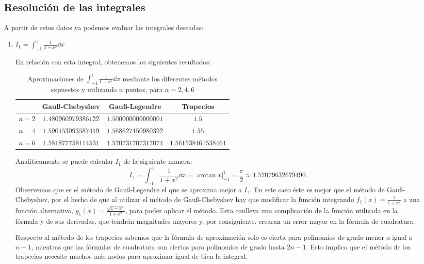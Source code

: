 \documentclass[a4paper]{article}
\begin{document}
\subsection*{Resolución de las integrales}
A partir de estos datos ya podemos evaluar las integrales deseadas:
\begin{enumerate}
    \item $\displaystyle I_1=\int_{-1}^1\frac{1}{1+x^2}\dd x$\par
    En relación con esta integral, obtenemos los siguientes resultados:
    \begin{table}[ht]
        \centering
        \captionsetup{width=0.9\textwidth}
        \begin{tabular}{|c|c|c|c|}
            \cline{2-4}
            \multicolumn{1}{c|}{} & Gau\ss-Chebyshev & Gau\ss-Legendre & Trapecios \\
            \hline
            $n=2$ & $1.480960979386122$ & $1.500000000000001$ & $1.5$ \\
            \hline
            $n=4$ & $1.590153093587419$ & $1.568627450980392$  & $1.55$ \\
            \hline
            $n=6$ & $1.581877758114531$ & $1.570731707317074$ & $1.561538461538461$ \\
            \hline
        \end{tabular}
        \caption{Aproximaciones de $\displaystyle\int_{-1}^1\frac{1}{1+x^2}\dd x$ mediante los diferentes métodos expuestos y utilizando $n$ puntos, para $n=2,4,6$}
    \end{table}\par
    Analíticamente se puede calcular $I_1$ de la siguiente manera:
    $$I_1=\int_{-1}^1\frac{1}{1+x^2}\dd x=\arctan x\Big|_{-1}^1=\frac{\pi}{2}\approx 1.57079632679490.$$ Observemos que es el método de Gau\ss-Legendre el que se aproxima mejor a $I_1$. En este caso éste es mejor que el método de Gau\ss-Chebyshev, por el hecho de que al utilizar el método de Gau\ss-Chebyshev hay que modificar la función integrando $f_1(x)=\frac{1}{1+x^2}$ a una función alternativa, $g_1(x)=\frac{\sqrt{1-x^2}}{1+x^2}$, para poder aplicar el método. Esto conlleva una complicación de la función utilizada en la fórmula y de sus derivadas, que tendrán magnitudes mayores y, por consiguiente, crearan un error mayor en la fórmula de cuadratura.\par Respecto al método de los trapecios sabemos que la fórmula de aproximación solo es cierta para polinomios de grado menor o igual a $n-1$, mientras que las fórmulas de cuadratura son ciertas para polinomios de grado hasta $2n-1$. Esto implica que el método de los trapecios necesite muchos más nodos para aproximar igual de bien la integral.

\end{enumerate}
\end{document}
